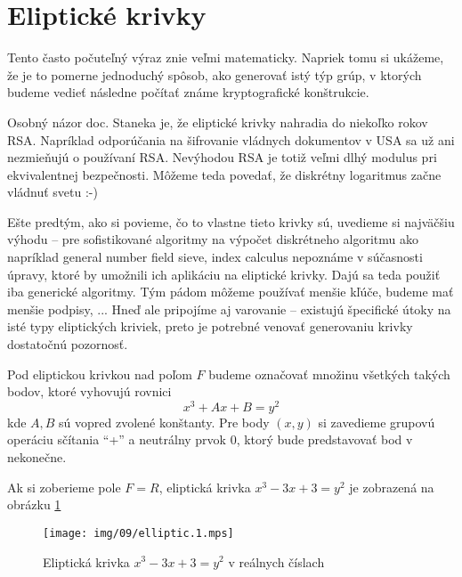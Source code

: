\section{Eliptické krivky}

Tento často počuteľný výraz znie veľmi matematicky. Napriek tomu si
ukážeme, že je to pomerne jednoduchý spôsob, ako generovať istý týp
grúp, v ktorých budeme vedieť následne počítať známe kryptografické
konštrukcie.

\begin{poznamka}
    Osobný názor doc. Staneka je, že eliptické krivky nahradia do
    niekoľko rokov RSA. Napríklad odporúčania na šifrovanie vládnych
    dokumentov v USA sa už ani nezmieňujú o používaní RSA. Nevýhodou
    RSA je totiž veľmi dlhý modulus pri ekvivalentnej bezpečnosti.
    Môžeme teda povedať, že diskrétny logaritmus začne vládnuť svetu
    :-)
\end{poznamka}

Ešte predtým, ako si povieme, čo to vlastne tieto krivky sú, uvedieme
si najväčšiu výhodu -- pre sofistikované algoritmy na
výpočet diskrétneho algoritmu ako napríklad general number field
sieve, index calculus nepoznáme v súčasnosti úpravy, ktoré by umožnili
ich aplikáciu na eliptické krivky. Dajú sa teda použiť iba generické
algoritmy. Tým pádom môžeme používať menšie kľúče, budeme mať menšie
podpisy, ... Hneď ale pripojíme aj varovanie -- existujú špecifické
útoky na isté typy eliptických kriviek, preto je potrebné venovať
generovaniu krivky dostatočnú pozornosť.

\begin{definicia}
    Pod eliptickou krivkou nad poľom $F$ budeme označovať množinu
    všetkých takých bodov, ktoré vyhovujú rovnici
    \begin{equation*}
        x^3 + A x + B = y^2
    \end{equation*}
    kde $A,B$ sú vopred zvolené konštanty.
    Pre body $(x,y)$ si zavedieme grupovú operáciu sčítania ``+''
    a neutrálny prvok $0$, ktorý bude predstavovať bod v nekonečne.
\end{definicia}

Ak si zoberieme pole $F=R$, eliptická krivka $x^3 -3x+3=y^2$ je
zobrazená na obrázku \ref{fig:elliptic1}

\begin{figure}[h]
    \centering
    \texttt{[image: img/09/elliptic.1.mps]}
    \caption{Eliptická krivka $x^3 - 3x +3 = y^2$ v reálnych číslach}
    \label{fig:elliptic1}
\end{figure}

